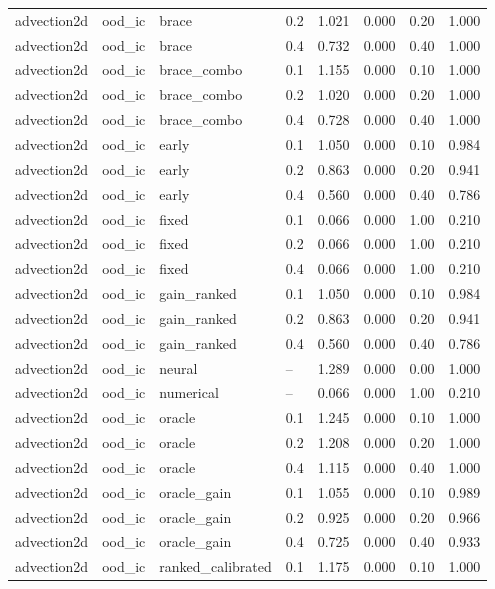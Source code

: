 \begin{tabular}{llllrrrr}
advection2d & ood\_ic & brace & 0.2 & 1.021 & 0.000 & 0.20 & 1.000 \\
advection2d & ood\_ic & brace & 0.4 & 0.732 & 0.000 & 0.40 & 1.000 \\
advection2d & ood\_ic & brace\_combo & 0.1 & 1.155 & 0.000 & 0.10 & 1.000 \\
advection2d & ood\_ic & brace\_combo & 0.2 & 1.020 & 0.000 & 0.20 & 1.000 \\
advection2d & ood\_ic & brace\_combo & 0.4 & 0.728 & 0.000 & 0.40 & 1.000 \\
advection2d & ood\_ic & early & 0.1 & 1.050 & 0.000 & 0.10 & 0.984 \\
advection2d & ood\_ic & early & 0.2 & 0.863 & 0.000 & 0.20 & 0.941 \\
advection2d & ood\_ic & early & 0.4 & 0.560 & 0.000 & 0.40 & 0.786 \\
advection2d & ood\_ic & fixed & 0.1 & 0.066 & 0.000 & 1.00 & 0.210 \\
advection2d & ood\_ic & fixed & 0.2 & 0.066 & 0.000 & 1.00 & 0.210 \\
advection2d & ood\_ic & fixed & 0.4 & 0.066 & 0.000 & 1.00 & 0.210 \\
advection2d & ood\_ic & gain\_ranked & 0.1 & 1.050 & 0.000 & 0.10 & 0.984 \\
advection2d & ood\_ic & gain\_ranked & 0.2 & 0.863 & 0.000 & 0.20 & 0.941 \\
advection2d & ood\_ic & gain\_ranked & 0.4 & 0.560 & 0.000 & 0.40 & 0.786 \\
advection2d & ood\_ic & neural & -- & 1.289 & 0.000 & 0.00 & 1.000 \\
advection2d & ood\_ic & numerical & -- & 0.066 & 0.000 & 1.00 & 0.210 \\
advection2d & ood\_ic & oracle & 0.1 & 1.245 & 0.000 & 0.10 & 1.000 \\
advection2d & ood\_ic & oracle & 0.2 & 1.208 & 0.000 & 0.20 & 1.000 \\
advection2d & ood\_ic & oracle & 0.4 & 1.115 & 0.000 & 0.40 & 1.000 \\
advection2d & ood\_ic & oracle\_gain & 0.1 & 1.055 & 0.000 & 0.10 & 0.989 \\
advection2d & ood\_ic & oracle\_gain & 0.2 & 0.925 & 0.000 & 0.20 & 0.966 \\
advection2d & ood\_ic & oracle\_gain & 0.4 & 0.725 & 0.000 & 0.40 & 0.933 \\
advection2d & ood\_ic & ranked\_calibrated & 0.1 & 1.175 & 0.000 & 0.10 & 1.000 \\

\end{tabular}
